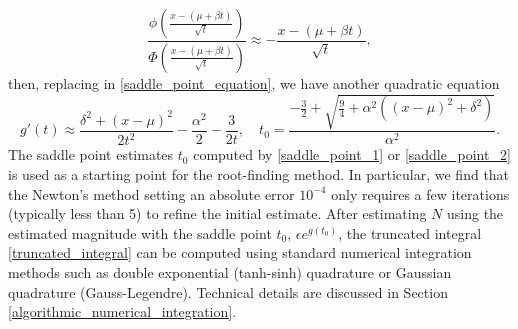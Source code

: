 \documentclass[10pt,a4paper,oneside]{article}
\numberwithin{equation}{section}
\begin{document}
\begin{equation*}
\frac{\phi\left(\frac{x - (\mu+ \beta t)}{\sqrt{t}}\right)}{\Phi\left(\frac{x - (\mu + \beta t)}{\sqrt{t}}\right)} \approx -\frac{x - (\mu + \beta t)}{\sqrt{t}},
\end{equation*}
then, replacing in \eqref{saddle_point_equation}, we have another quadratic equation
\begin{equation}\label{saddle_point_2}
g'(t) \approx \frac{\delta^2 + (x-\mu)^2}{2t^2} -\frac{\alpha^2}{2} -\frac{3}{2t}, \quad t_0 = \frac{-\frac{3}{2} + \sqrt{\frac{9}{4} + \alpha^2 \left((x-\mu)^2 + \delta^2\right)}}{\alpha^2}.
\end{equation}
The saddle point estimates $t_0$ computed by \eqref{saddle_point_1} or \eqref{saddle_point_2} is used as a starting point for the root-finding method. In particular, we find that the Newton's method setting an absolute error $10^{-4}$ only requires a few iterations (typically less than 5) to refine the initial estimate. After estimating $N$ using the estimated magnitude with the saddle point $t_0$, $\epsilon e^{g(t_0)}$, the truncated integral \eqref{truncated_integral} can be computed using standard numerical integration methods such as double exponential (tanh-sinh) quadrature or Gaussian quadrature (Gauss-Legendre). Technical details are discussed in Section \ref{algorithmic_numerical_integration}.
\end{document}
